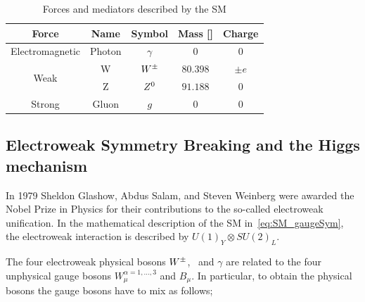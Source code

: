			\begin{table}[!htb]\centering\caption{Forces and mediators described by the SM}							
				\begin{tabular}{c|c|c|c|c}
					\hline \hline
					\textbf{Force} & \textbf{Name} & \textbf{Symbol} & \textbf{Mass} [\GeV]& \textbf{Charge} \\ \hline \hline
					Electromagnetic & Photon & $\gamma$ & 0 & 0 \\ \hline
					\multirow{2}{*}{Weak} & W & $W^{\pm}$ & $80.398$ & $\pm e$ \\
					& Z & $Z^0$ & $91.188$ & 0 \\\hline
					Strong & Gluon & $g$ & $0$ & $0$ \\\hline\hline
				\end{tabular}						
			\label{tab:interactions} 
			\end{table}



		\subsection{Electroweak Symmetry Breaking and the Higgs mechanism}
		\label{sec:ewksb}

			In 1979 Sheldon Glashow, Abdus Salam, and Steven Weinberg were awarded the Nobel Prize in Physics for their contributions to the so-called electroweak unification. In the mathematical description of the SM in~\ref{eq:SM_gaugeSym}, the electroweak interaction is described by $U(1)_Y \otimes SU(2)_L$. 

			The four electroweak physical bosons $W^{\pm}$, \Zboson\ and $\gamma$ are related to the four unphysical gauge bosons $W_{\mu}^{\alpha = 1,\dots,3}$ and $B_\mu$. In particular, to obtain the physical bosons the gauge bosons have to mix as follows;


